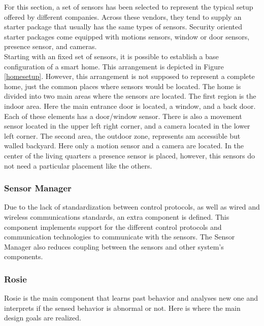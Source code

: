 For this section, a set of sensors has been selected to represent the typical setup offered by different companies. Across these vendors, they tend to supply an starter package that usually has the same types of sensors. Security oriented starter packages come equipped with motions sensors, window or door sensors, presence sensor, and cameras.\\
Starting with an fixed set of sensors, it is possible to establish a base configuration of a smart home. This arrangement is depicted in Figure \ref{homesetup}. However, this arrangement is not supposed to represent a complete home, just the common places where sensors would be located. 
The home is divided into two main areas where the sensors are located. The first region is the indoor area. Here the main entrance door is located, a window, and a back door. Each of these elements has a door/window sensor. There is also a movement sensor located in the upper left right corner, and a camera located in the lower left corner. The second area, the outdoor zone, represents am accessible but walled backyard. Here only a motion sensor and a camera are located. In the center of the living quarters a presence sensor is placed, however, this sensors do not need a particular placement like the others.


\subsubsection{Sensor Manager}
\label{sensorManager}
Due to the lack of standardization between control protocols, as well as wired and wireless communications standards, an extra component is defined. This component implements support for the different control protocols and communication technologies to communicate with the sensors. The Sensor Manager also reduces coupling between the sensors and other system's components. 

\subsubsection{Rosie}


Rosie is the main component that learns past behavior and analyses new one and interprets if the sensed behavior is abnormal or not. Here is where the main design goals are realized. 

